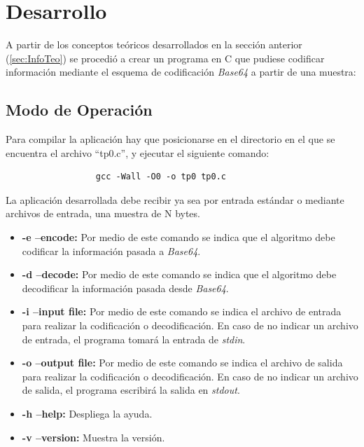 \documentclass[a4paper,10pt, fleqn]{article}
\begin{document}
					
\section{Desarrollo}
	A partir de los conceptos teóricos desarrollados en la sección anterior (\ref{sec:InfoTeo}) se procedió a crear un programa en 
	C que pudiese codificar información mediante el esquema de codificación \emph{Base64} a partir de una muestra:
	\vspace{0.5cm}

	\subsection{Modo de Operación}
                Para compilar la aplicación hay que posicionarse en el directorio en el que se encuentra el archivo ``tp0.c'', y ejecutar el siguiente comando:
                \begin{verbatim}
                  gcc -Wall -O0 -o tp0 tp0.c
                \end{verbatim}
 
		La aplicación desarrollada debe recibir ya sea por entrada estándar o mediante archivos de entrada, una muestra de N bytes. 

		\begin{itemize}
			\item \textbf{-e --encode:} Por medio de este comando se indica que el algoritmo debe codificar la información pasada a \emph{Base64}.
			\item \textbf{-d --decode:} Por medio de este comando se indica que el algoritmo debe decodificar la información pasada desde \emph{Base64}.
			\item \textbf{-i --input file:} Por medio de este comando se indica el archivo de entrada para realizar la codificación o decodificación. En caso de no indicar un archivo de entrada, el programa tomará la entrada de \emph{stdin}.
			\item \textbf{-o --output file:} Por medio de este comando se indica el archivo de salida para realizar la codificación o decodificación. En caso de no indicar un archivo de salida, el programa escribirá la salida en \emph{stdout}.
			\item \textbf{-h --help:} Despliega la ayuda.
			\item \textbf{-v --version:} Muestra la versión.
		\end{itemize} 
		
		\vspace{0.5cm}
	
\end{document}
